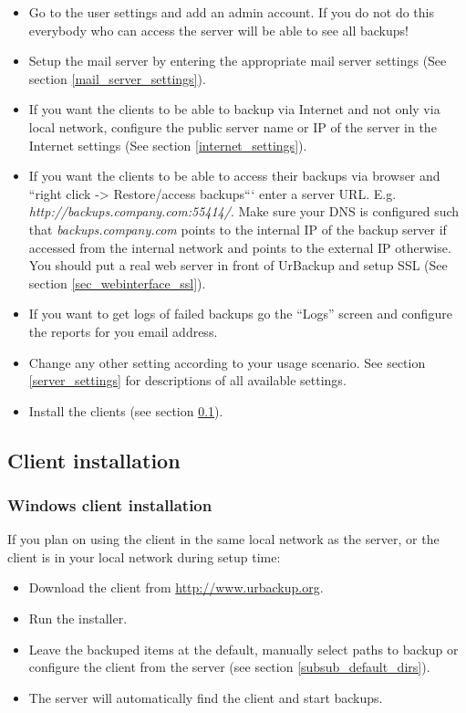 \documentclass[a4paper,10pt]{article}
\begin{document}
\begin{itemize}
  \item Go to the user settings and add an admin account. If you do not do this everybody who can access the server will be able to see all backups!
  \item Setup the mail server by entering the appropriate mail server settings (See section \ref{mail_server_settings}).
  \item If you want the clients to be able to backup via Internet and not only via local network, configure the public server name or IP of the server in the Internet settings (See section \ref{internet_settings}).
  \item If you want the clients to be able to access their backups via browser and ``right click -> Restore/access backups``` enter a server URL. E.g. \textsl{http://backups.company.com:55414/}. Make sure your DNS is configured such that \textsl{backups.company.com} points to the internal IP of the backup server if accessed from the internal network and points to the external IP otherwise. You should put a real web server in front of UrBackup and setup SSL (See section \ref{sec_webinterface_ssl}).  
  \item If you want to get logs of failed backups go the ``Logs'' screen and configure the reports for you email address.
  \item Change any other setting according to your usage scenario. See section \ref{server_settings} for descriptions of all available settings.
  \item Install the clients (see section \ref{client_installation}).
\end{itemize}

\subsection{Client installation}
\label{client_installation}

\subsubsection{Windows client installation}

\noindent If you plan on using the client in the same local network as the server, or the client is in your local network during setup time:

\begin{itemize}
  \item Download the client from \url{http://www.urbackup.org}.
  \item Run the installer.
  \item Leave the backuped items at the default, manually select paths to backup or configure the client from the server (see section \ref{subsub_default_dirs}).
  \item The server will automatically find the client and start backups.
\end{itemize}
\end{document}
